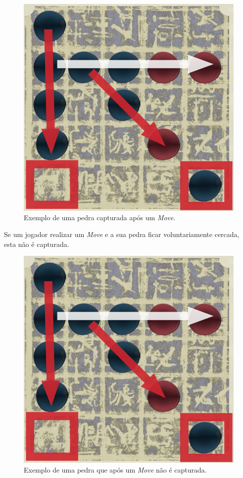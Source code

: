 \documentclass[a4paper]{article}
\begin{document}
\begin{figure}[!htb]
\centering
\includegraphics[scale=0.3]{push2.png} 
\caption{Exemplo de uma pedra capturada após um \textit{Move}.}
\end{figure}

\newpage

Se um jogador realizar um \textit{Move} e a sua pedra ficar voluntariamente cercada, esta não é capturada.

\begin{figure}[!htb]
\centering
\includegraphics[scale=0.3]{push2.png} 
\caption{Exemplo de uma pedra que após um \textit{Move} não é capturada.}
\end{figure}
\end{document}
